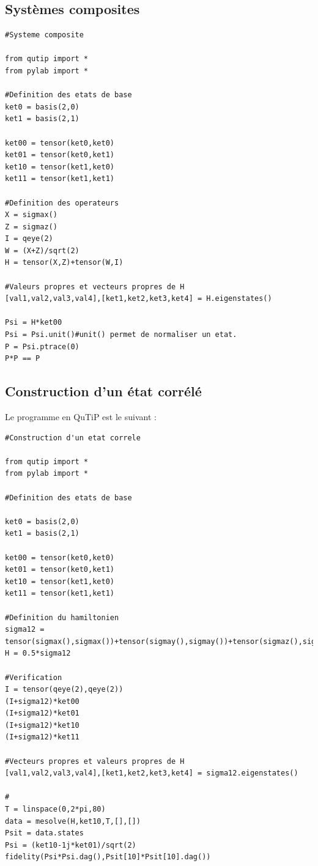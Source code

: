 \documentclass[a4paper,12pt]{book}
\numberwithin{equation}{section}
\begin{document}
\subsection{Systèmes composites}
\begin{lstlisting}
#Systeme composite

from qutip import *
from pylab import *

#Definition des etats de base
ket0 = basis(2,0)
ket1 = basis(2,1)

ket00 = tensor(ket0,ket0)
ket01 = tensor(ket0,ket1)
ket10 = tensor(ket1,ket0)
ket11 = tensor(ket1,ket1)

#Definition des operateurs
X = sigmax()
Z = sigmaz()
I = qeye(2)
W = (X+Z)/sqrt(2)
H = tensor(X,Z)+tensor(W,I)

#Valeurs propres et vecteurs propres de H
[val1,val2,val3,val4],[ket1,ket2,ket3,ket4] = H.eigenstates()

Psi = H*ket00
Psi = Psi.unit()#unit() permet de normaliser un etat.
P = Psi.ptrace(0)
P*P == P

\end{lstlisting}

\subsection{Construction d'un état corrélé}
Le programme en QuTiP est le suivant :
\begin{lstlisting}
#Construction d'un etat correle

from qutip import *
from pylab import *

#Definition des etats de base

ket0 = basis(2,0)
ket1 = basis(2,1)

ket00 = tensor(ket0,ket0)
ket01 = tensor(ket0,ket1)
ket10 = tensor(ket1,ket0)
ket11 = tensor(ket1,ket1)

#Definition du hamiltonien
sigma12 = tensor(sigmax(),sigmax())+tensor(sigmay(),sigmay())+tensor(sigmaz(),sigmaz())
H = 0.5*sigma12

#Verification
I = tensor(qeye(2),qeye(2))
(I+sigma12)*ket00
(I+sigma12)*ket01
(I+sigma12)*ket10
(I+sigma12)*ket11

#Vecteurs propres et valeurs propres de H
[val1,val2,val3,val4],[ket1,ket2,ket3,ket4] = sigma12.eigenstates()

#
T = linspace(0,2*pi,80)
data = mesolve(H,ket10,T,[],[])
Psit = data.states
Psi = (ket10-1j*ket01)/sqrt(2)
fidelity(Psi*Psi.dag(),Psit[10]*Psit[10].dag())

\end{lstlisting}
\end{document}

